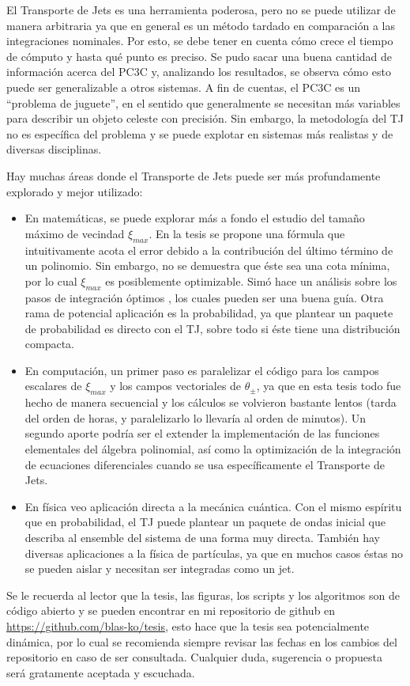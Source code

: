 El Transporte de Jets es una herramienta poderosa, pero no se puede utilizar de manera arbitraria ya que en general es un método tardado en comparación a las integraciones nominales. Por esto, se debe tener en cuenta cómo crece el tiempo de cómputo y hasta qué punto es preciso. Se pudo sacar una buena cantidad de información acerca del PC3C y, analizando los resultados, se observa cómo esto puede ser generalizable a otros sistemas. A fin de cuentas, el PC3C es un ``problema de juguete'', en el sentido que generalmente se necesitan más variables para describir un objeto celeste con precisión. Sin embargo, la metodología del TJ no es específica del problema y se puede explotar en sistemas más realistas y de diversas disciplinas. 

Hay muchas áreas donde el Transporte de Jets puede ser más profundamente explorado y mejor utilizado: 
\begin{itemize}
\item En matemáticas, se puede explorar más a fondo el estudio del tamaño máximo de vecindad $\xi_{max}$. En la tesis se propone una fórmula que intuitivamente acota el error debido a la contribución del último término de un polinomio. Sin embargo, no se demuestra que éste sea una cota mínima, por lo cual $\xi_{max}$ es posiblemente optimizable. Simó hace un análisis sobre los pasos de integración óptimos \cite[Capítulo~15]{Simo2001}, los cuales pueden ser una buena guía. Otra rama de potencial aplicación es la probabilidad, ya que plantear un paquete de probabilidad es directo con el TJ, sobre todo si éste tiene una distribución compacta.

\item En computación, un primer paso es paralelizar el código para los campos escalares de $\xi_{max}$ y los campos vectoriales de $\theta_{\pm}$, ya que en esta tesis todo fue hecho de manera secuencial y los cálculos se volvieron bastante lentos (tarda del orden de horas, y paralelizarlo lo llevaría al orden de minutos). Un segundo aporte podría ser el extender la implementación de las funciones elementales del álgebra polinomial, así como la optimización de la integración de ecuaciones diferenciales cuando se usa específicamente el Transporte de Jets.

\item En física veo aplicación directa a la mecánica cuántica. Con el mismo espíritu que en probabilidad, el TJ puede plantear un paquete de ondas inicial que describa al ensemble del sistema de una forma muy directa. También hay diversas aplicaciones a la física de partículas, ya que en muchos casos éstas no se pueden aislar y necesitan ser integradas como un jet.
\end{itemize}

Se le recuerda al lector que la tesis, las figuras, los scripts y los algoritmos son de código abierto y se pueden encontrar en mi repositorio de github en \href{https://github.com/blas-ko/tesis}{https://github.com/blas-ko/tesis}, esto hace que la tesis sea potencialmente dinámica, por lo cual se recomienda siempre revisar las fechas en los cambios del repositorio en caso de ser consultada. Cualquier duda, sugerencia o propuesta será gratamente aceptada y escuchada.

